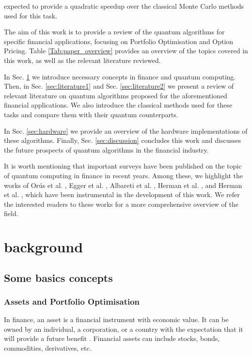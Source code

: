 \documentclass[prx,twocolumn,floatfix,superscriptaddress,longbibliography]{revtex4-1}
\begin{document}
expected to provide a quadratic speedup over the classical Monte Carlo methods used for this task. 

The aim of this work is to provide a review of the quantum algorithms for specific financial applications, focusing on Portfolio Optimisation and Option Pricing. Table \ref{Tab:paper_overview} provides an overview of the topics covered in this work, as well as the relevant literature reviewed. 

In Sec. \ref{sec:background} we introduce necessary concepts in finance and quantum computing. Then, in Sec. \ref{sec:literature1} and Sec. \ref{sec:literature2}  we present a review of relevant literature on quantum algorithms proposed for the aforementioned financial applications. We also 
  introduce the classical methods used for these tasks and compare them with their quantum counterparts.

In Sec. \ref{sec:hardware} we provide an overview of the hardware implementations of these algorithms. Finally, Sec. \ref{sec:discussion} concludes this work and discusses the future prospects of quantum algorithms in the financial industry. 

It is worth mentioning that important surveys have been published on the topic of quantum computing in finance in recent years. Among these, we highlight the works of Orús et al. \cite{Orus2019}, Egger et al. \cite{Egger2020a}, Albareti et al. \cite{Albareti2022}, Herman et al. \cite{Herman2022}, and Herman et al. \cite{Herman2023}, which have been instrumental in the development of this work. We refer the interested readers to these works for a more comprehensive overview of the field.

\section{background}\label{sec:background}
\subsection{Some basics concepts}
\subsubsection{Assets and Portfolio Optimisation}

In finance, an asset is a financial instrument with economic value. It can be owned by an individual, a corporation, or a country with the expectation that it will provide a future benefit \cite{zotero-1119}. Financial assets can include stocks, bonds, commodities, derivatives, etc. 
\end{document}

